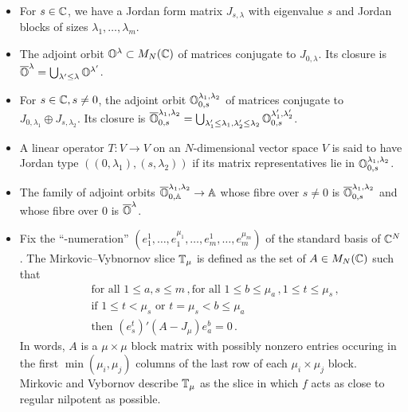 \documentclass[draft]{article}
\begin{document}
\begin{itemize}
    \item For $ s \in \mathbb C$, we have a Jordan form matrix $ J_{s,\lambda}$ with eigenvalue $ s$ and Jordan blocks of sizes $ \lambda_1, \dots, \lambda_m$. 
    \item The adjoint orbit $ \mathbb O^\lambda \subset M_N(\mathbb C)$ of matrices conjugate to $ J_{0,\lambda}$.  Its closure is $ \overline{\mathbb O}^\lambda = \bigcup_{\lambda' \le \lambda} \mathbb O^{\lambda'}$.
    \item For $ s \in \mathbb C, s \ne 0$, the adjoint orbit $ \mathbb O^{\lambda_1, \lambda_2}_{0,s}$ of matrices conjugate to $ J_{0,\lambda_1} \oplus J_{s,\lambda_2}$.  Its closure is $ \overline{\mathbb O}^{\lambda_1, \lambda_2}_{0,s} = \bigcup_{\lambda_1' \le \lambda_1, \lambda'_2 \le \lambda_2} \mathbb O^{\lambda_1', \lambda'_2}_{0,s}$. 
    \item A linear operator $ T : V \rightarrow V $ on an $N$-dimensional vector space $V$ is said to have Jordan type $((0,\lambda_1), (s,\lambda_2))$ if its matrix representatives lie in $ \mathbb O^{\lambda_1, \lambda_2}_{0,s}$.
    \item The family of adjoint orbits $ \overline{\mathbb O}^{\lambda_1, \lambda_2}_{0,\mathbb A} \rightarrow \mathbb A$ whose fibre over $ s \ne 0 $ is $ \overline{\mathbb O}^{\lambda_1, \lambda_2}_{0,s}$ and whose fibre over 0 is $\overline{\mathbb O}^\lambda$.   
    
    \item Fix the ``\mu-numeration'' \((e^1_1,\ldots,e^{\mu_1}_1,\ldots,e^1_m,\ldots,e^{\mu_m}_m)\) of the standard basis of $\mathbb C^N$. The Mirkovic--Vybnornov slice $\mathbb T_\mu$ is defined as the set of $A\in M_N(\mathbb C)$ such that 
    \[
        \begin{aligned}
            &\text{for all } 1 \le a,s\le m\,,
            \text{for all } 1\le b\le \mu_a\,, 1\le t\le \mu_s\,, \\
            &\text{if } 1\le t < \mu_s \text{ or } t = \mu_s < b \le \mu_a \\
            &\text{then } (e^t_s)' (A-J_\mu) e^b_a = 0 \,.
        \end{aligned}    
    \]
    In words, $A$ is a $\mu\times\mu$ block matrix with possibly nonzero entries occuring in the first $\min(\mu_i,\mu_j)$ columns of the last row of each $\mu_i\times\mu_j$ block. 
    Mirkovic and Vybornov describe $\mathbb T_\mu$ as the slice in which $f$ acts as close to regular nilpotent as possible.
    

\end{itemize}
\end{document}
